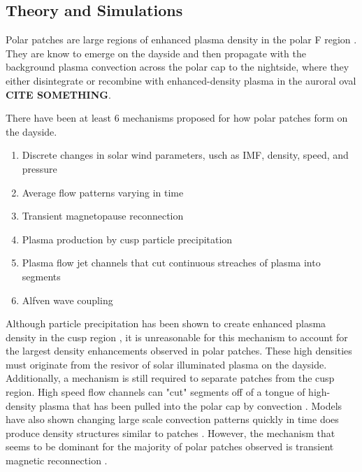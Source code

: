 \subsection{Theory and Simulations}

Polar patches are large regions of enhanced plasma density in the polar F region \citep[][e.g.]{Weber1984,Buchau1983}.  They are know to emerge on the dayside and then propagate with the background plasma convection across the polar cap to the nightside, where they either disintegrate or recombine with enhanced-density plasma in the auroral oval \textbf{CITE SOMETHING}.

There have been at least 6 mechanisms proposed for how polar patches form on the dayside.
\begin{enumerate}
	\item Discrete changes in solar wind parameters, usch as IMF, density, speed, and pressure \citep{Sojka1994}
	\item Average flow patterns varying in time \citep{Anderson1988}
	\item Transient magnetopause reconnection \citep{Lockwook1992b}
	\item Plasma production by cusp particle precipitation \citep{Rodger1994,Millward1999}
	\item Plasma flow jet channels that cut continuous streaches of plasma into segments 	\citep{Valladares1998}
	\item Alfven wave coupling \citep{Prikryl1999}
\end{enumerate}
Although particle precipitation has been shown to create enhanced plasma density in the cusp region \citep{Roger1994}, it is unreasonable for this mechanism to account for the largest density enhancements observed in polar patches.  These high densities must originate from the resivor of solar illuminated plasma on the dayside.  Additionally, a mechanism is still required to separate patches from the cusp region.  High speed flow channels can "cut" segments off of a tongue of high-density plasma that has been pulled into the polar cap by convection \citep{Valladares1994,Valladares1998}.  Models have also shown changing large scale convection patterns quickly in time does produce density structures similar to patches \citep{Anderson1988}.  However, the mechanism that seems to be dominant for the majority of polar patches observed is transient magnetic reconnection \citep{Carlson2012}.

